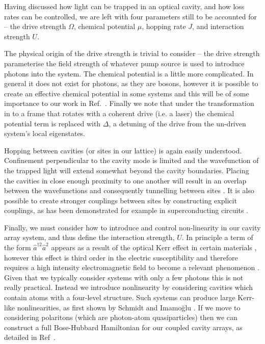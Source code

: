Having discussed how light can be trapped in an optical cavity, and how loss rates can be controlled, we are left with four parameters still to be accounted for -- the drive strength \(\Omega\), chemical potential \(\mu\), hopping rate \(J\), and interaction strength \(U\).

The physical origin of the drive strength is trivial to consider -- the drive strength parameterise the field strength of whatever pump source is used to introduce photons into the system. The chemical potential is a little more complicated. In general it does not exist for photons, as they are bosons, however it is possible to create an effective chemical potential in some systems \cite{HAT15,MOHSS17,LBSRFCC17} and this will be of some importance to our work in Ref.~\cite{BH17}. Finally we note that under the transformation in to a frame that rotates with a coherent drive (i.e. a laser) the chemical potential term is replaced with \(\Delta\), a detuning of the drive from the un-driven system's local eigenstates. 

Hopping between cavities (or sites in our lattice) is again easily understood. Confinement perpendicular to the cavity mode is limited and the wavefunction of the trapped light will extend somewhat beyond the cavity boundaries. Placing the cavities in close enough proximity to one another will result in an overlap between the wavefunctions and consequently tunnelling between sites \cite{HBP06,HBP08}. It is also possible to create stronger couplings between sites by constructing explicit couplings, as has been demonstrated for example in superconducting circuits \cite{MajerEA}.

Finally, we must consider how to introduce and control non-linearity in our cavity array system, and thus define the interaction strength, \(U\). In principle a term of the form \(\hat{a}^{\dagger 2}\hat{a}^{2}\) appears as a result of the optical Kerr effect in certain materials \cite{KY86}, however this effect is third order in the electric susceptibility and therefore requires a high intensity electromagnetic field to become a relevant phenomenon \cite{Boyd_KerrNL}. Given that we typically consider systems with only a few photons this is not really practical. Instead we introduce nonlinearity by considering cavities which contain atoms with a four-level structure. Such systems can produce large Kerr-like nonlinearities, as first shown by Schmidt and Imamo\u{g}lu \cite{SI96}. If we move to considering polaritons (which are photon-atom quasiparticles) then we can construct a full Bose-Hubbard Hamiltonian for our coupled cavity arrays, as detailed in Ref~\cite{HBP08}.

